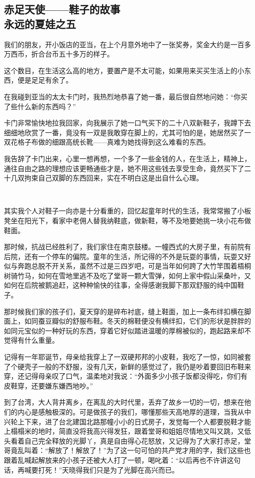 \subsection{赤足天使——鞋子的故事\\\small{永远的夏娃之五}}


\par 我们的朋友，开小饭店的亚当，在上个月意外地中了一张奖券，奖金大约是一百多万西币，折合台币五十多万的样子。
\par 这个数目，在生活这么高的地方，要置产是不太可能，如果用来买买生活上的小东西，便是足足有余了。
\par 在我碰到亚当的太太卡门时，我热烈地恭喜了她一番，最后很自然地问她：“你买了些什么新的东西吗？”
\par 卡门非常愉快地拉我回家，向我展示了她一口气买下的二十八双新鞋子，我蹲下去细细地欣赏了一番，竟没有一双是我敢穿在脚上的，尤其可怕的是，她居然买了一双花格子布做的细跟高统长靴——真难为她找得到这么难看的东西。
\par 我告辞了卡门出来，心里一想再想，一个多了一些金钱的人，在生活上，精神上，通往自由之路的理想应该更畅通些才是，她不用这些钱去享受生命，竟然买下了二十几双拘束自己双脚的东西回来，实在不明白这是出自什么心理。
\par  
\par 其实我个人对鞋子一向亦是十分看重的，回忆起童年时代的生活，我常常搬了小板凳坐在阳光下，看家中老佣人替我纳鞋底，做新鞋，等不及地要她挑一块小花布做鞋面。
\par 那时候，抗战已经胜利了，我们家住在南京鼓楼。一幢西式的大房子里，有前院有后院，还有一个停车的偏院。童年的生活，所记得的不外是玩耍的事情，玩耍又好似与奔跑总脱不开关系，虽然不过是三四岁吧，可是当年如何跨了大竹竿围着梧桐树骑竹马，如何在雪地里逃不及吃了堂哥一颗大雪弹，如何上家中假山采桑叶，又如何在后院被鹅追赶，这种种愉快的往事，全得感谢我脚下那双舒服的纯中国鞋子。
\par 那时候我们家的孩子们，夏天穿的是碎布衬底，缝上鞋面，加上一条布绊扣横在脚面上，如同蚕豆瓣似的舒服布鞋。冬天的棉鞋便没有横绊扣，它们的形状是胖胖的如同元宝似的一种好玩的东西，穿着它好似踏进温暖的厚棉被似的，跑起路来却不觉得有什么重量。
\par 记得有一年耶诞节，母亲给我穿上了一双硬邦邦的小皮鞋，我吃了一惊，如同被套了个硬壳子一般的不舒服，没有几天，新鲜的感觉过了，我仍是吵着要回旧布鞋来穿，还记得母亲叹了口气，温柔地对我说：“外面多少小孩子饭都没得吃，你们有皮鞋穿，还要嫌东嫌西地吵。”
\par 到了台湾，大人背井离乡，在离乱的大时代里，丢弃了故乡一切的一切，想来在他们的内心是感触极深的。可是做孩子的我们，哪懂那些天高地厚的道理，当我从中兴轮上下来，进了台北建国北路那幢小小的日式房子，发觉每一个人都要脱鞋才能上榻榻米的地时，简直没将我高兴得发狂，跟着堂哥和姐姐尽情地又叫又跳，又低头看着自己完全释放的光脚丫，真是自由得心花怒放，又记得为了大家打赤足，堂哥竟乱叫着：“解放了！解放了！”为了这一句可怕的共产党才用的字，我们这些也跟着乱喊起解放来的小孩子还被大人打了一顿，喝叱着：“以后再也不许讲这句话，再喊要打死！”天晓得我们只是为了光脚在高兴而已。
